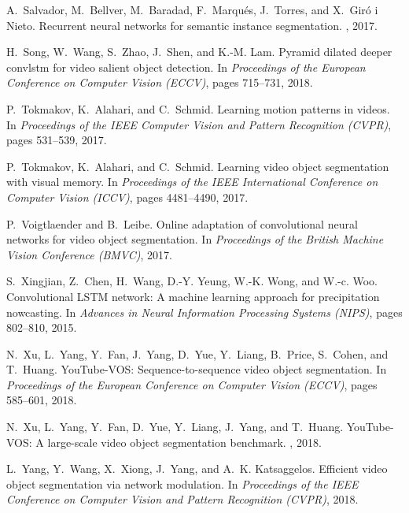 \documentclass[10pt,twocolumn,letterpaper]{article}
\begin{document}
\begin{thebibliography}{10}
A.~Salvador, M.~Bellver, M.~Baradad, F.~Marqu{\'{e}}s, J.~Torres, and
  X.~{Gir{\'{o}} i Nieto}.
\newblock Recurrent neural networks for semantic instance segmentation.
, 2017.

H.~Song, W.~Wang, S.~Zhao, J.~Shen, and K.-M. Lam.
\newblock Pyramid dilated deeper convlstm for video salient object detection.
\newblock In {\em Proceedings of the European Conference on Computer Vision
  (ECCV)}, pages 715--731, 2018.

P.~Tokmakov, K.~Alahari, and C.~Schmid.
\newblock Learning motion patterns in videos.
\newblock In {\em Proceedings of the IEEE Computer Vision and Pattern
  Recognition (CVPR)}, pages 531--539, 2017.

P.~Tokmakov, K.~Alahari, and C.~Schmid.
\newblock Learning video object segmentation with visual memory.
\newblock In {\em Proceedings of the IEEE International Conference on Computer
  Vision (ICCV)}, pages 4481--4490, 2017.

P.~Voigtlaender and B.~Leibe.
\newblock Online adaptation of convolutional neural networks for video object
  segmentation.
\newblock In {\em Proceedings of the British Machine Vision Conference (BMVC)},
  2017.

S.~Xingjian, Z.~Chen, H.~Wang, D.-Y. Yeung, W.-K. Wong, and W.-c. Woo.
\newblock Convolutional {LSTM} network: A machine learning approach for
  precipitation nowcasting.
\newblock In {\em Advances in Neural Information Processing Systems (NIPS)},
  pages 802--810, 2015.

N.~Xu, L.~Yang, Y.~Fan, J.~Yang, D.~Yue, Y.~Liang, B.~Price, S.~Cohen, and
  T.~Huang.
\newblock You{T}ube-{VOS}: Sequence-to-sequence video object segmentation.
\newblock In {\em Proceedings of the European Conference on Computer Vision
  (ECCV)}, pages 585--601, 2018.

N.~Xu, L.~Yang, Y.~Fan, D.~Yue, Y.~Liang, J.~Yang, and T.~Huang.
\newblock You{T}ube-{VOS}: A large-scale video object segmentation benchmark.
, 2018.

L.~Yang, Y.~Wang, X.~Xiong, J.~Yang, and A.~K. Katsaggelos.
\newblock Efficient video object segmentation via network modulation.
\newblock In {\em Proceedings of the IEEE Conference on Computer Vision and
  Pattern Recognition (CVPR)}, 2018.

\end{thebibliography}
 
\end{document}
